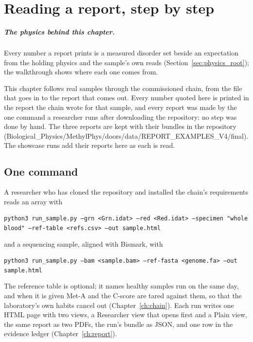 \chapter{Reading a report, step by step}\label{ch:walkthrough}

\paragraph{The physics behind this chapter.} Every number a report prints is a measured disorder set beside an expectation from the holding physics and the sample's own reads (Section~\ref{sec:physics_root}); the walkthrough shows where each one comes from.

This chapter follows real samples through the commissioned chain, from the file that goes in to the report that comes out. Every number
quoted here is printed in the report the chain wrote for that sample, and every report was made by the one command a researcher runs after
downloading the repository: no step was done by hand. The three reports are kept with their bundles in the repository
(Biological\_Physics/MethylPhys/doors/data/REPORT\_EXAMPLES\_V4/final). The showcase runs add their reports here as each is read.

\section{One command}

A researcher who has cloned the repository and installed the chain's requirements reads an array with
\begin{center}\small\texttt{python3 run\_sample.py --grn <Grn.idat> --red <Red.idat> --specimen "whole blood" --ref-table <refs.csv> --out sample.html}\end{center}
and a sequencing sample, aligned with Bismark, with
\begin{center}\small\texttt{python3 run\_sample.py --bam <sample.bam> --ref-fasta <genome.fa> --out sample.html}\end{center}
The reference table is optional; it names healthy samples run on the same day, and when it is given Met-A and the C-score are tared against them,
so that the laboratory's own habits cancel out (Chapter~\ref{ch:chain}). Each run writes one HTML page with two views, a Researcher view that opens
first and a Plain view, the same report as two PDFs, the run's bundle as JSON, and one row in the evidence ledger (Chapter~\ref{ch:report}).

